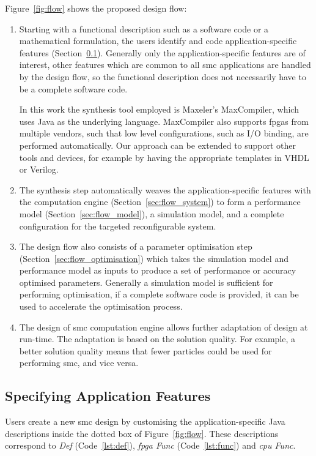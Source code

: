 Figure~\ref{fig:flow} shows the proposed design flow:

\begin{enumerate}
\item Starting with a functional description such as a software code or a mathematical formulation, the users identify and code application-specific features (Section~\ref{sec:flow_kernel}). 
Generally only the application-specific features are of interest, other features which are common to all \gls{smc} applications are handled by the design flow, so the functional description does not necessarily have to be a complete software code.

In this work the synthesis tool employed is Maxeler's MaxCompiler, which uses Java as the underlying language. 
MaxCompiler also supports \glspl{fpga} from multiple vendors, such that low level configurations, such as I/O binding, are performed automatically.
Our approach can be extended to support other tools and devices, for example by having the appropriate templates in VHDL or Verilog.
\item The synthesis step automatically weaves the application-specific features with the computation engine (Section~\ref{sec:flow_system}) to form a performance model (Section~\ref{sec:flow_model}), a simulation model, and a complete configuration for the targeted reconfigurable system.
\item The design flow also consists of a parameter optimisation step (Section~\ref{sec:flow_optimisation}) which takes the simulation model and performance model as inputs to produce a set of performance or accuracy optimised parameters.
Generally a simulation model is sufficient for performing optimisation, if a complete software code is provided, it can be used to accelerate the optimisation process.
\item The design of \gls{smc} computation engine allows further adaptation of design at run-time.
The adaptation is based on the solution quality.
For example, a better solution quality means that fewer particles could be used for performing \gls{smc}, and vice versa.
\end{enumerate}




\subsection{Specifying Application Features}
\label{sec:flow_kernel}

Users create a new \gls{smc} design by customising the application-specific Java descriptions inside the dotted box of Figure~\ref{fig:flow}.
These descriptions correspond to \textit{Def} (Code~\ref{lst:def}), \textit{\gls{fpga} Func} (Code~\ref{lst:func}) and \textit{\gls{cpu} Func}.

